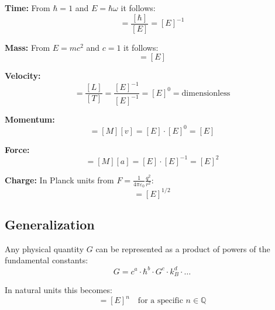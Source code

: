 \documentclass[11pt,a4paper]{article}
\begin{document}
	\textbf{Time:} From $\hbar = 1$ and $E = \hbar \omega$ it follows:
	\begin{equation}
		[T] = \frac{[\hbar]}{[E]} = [E]^{-1}
	\end{equation}
	
	\textbf{Mass:} From $E = mc^2$ and $c = 1$ it follows:
	\begin{equation}
		[M] = [E]
	\end{equation}
	
	\textbf{Velocity:} 
	\begin{equation}
		[v] = \frac{[L]}{[T]} = \frac{[E]^{-1}}{[E]^{-1}} = [E]^0 = \text{dimensionless}
	\end{equation}
	
	\textbf{Momentum:}
	\begin{equation}
		[p] = [M][v] = [E] \cdot [E]^0 = [E]
	\end{equation}
	
	\textbf{Force:}
	\begin{equation}
		[F] = [M][a] = [E] \cdot [E]^{-1} = [E]^2
	\end{equation}
	
	\textbf{Charge:} In Planck units from $F = \frac{1}{4\pi\varepsilon_0} \frac{q^2}{r^2}$:
	\begin{equation}
		[q] = [E]^{1/2}
	\end{equation}
	
	\subsection{Generalization}
	
	Any physical quantity $G$ can be represented as a product of powers of the fundamental constants:
	\begin{equation}
		G = c^a \cdot \hbar^b \cdot G^c \cdot k_B^d \cdot \ldots
	\end{equation}
	
	In natural units this becomes:
	\begin{equation}
		[G] = [E]^n \quad \text{for a specific } n \in \mathbb{Q}
	\end{equation}
	
\end{document}

